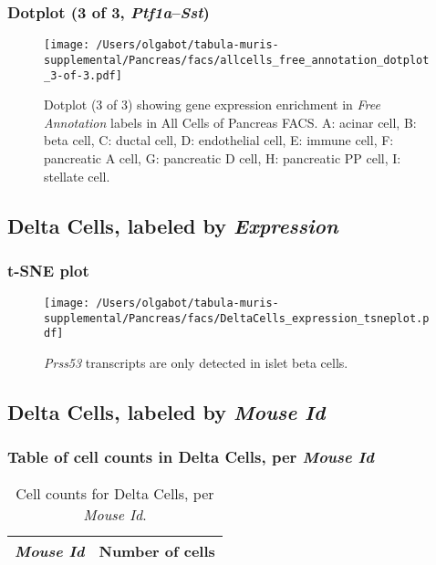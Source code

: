 \clearpage

\subsubsection{Dotplot (3 of 3, \emph{Ptf1a}--\emph{Sst})}
\begin{figure}[h]
\centering
\texttt{[image: /Users/olgabot/tabula-muris-supplemental/Pancreas/facs/allcells\_free\_annotation\_dotplot\_3-of-3.pdf]}

\caption{ Dotplot (3 of 3)  showing gene expression enrichment in \emph{Free Annotation} labels in All Cells of Pancreas FACS. A: acinar cell, B: beta cell, C: ductal cell, D: endothelial cell, E: immune cell, F: pancreatic A cell, G: pancreatic D cell, H: pancreatic PP cell, I: stellate cell.}
\end{figure}


\clearpage

\subsection{Delta Cells, labeled by \emph{Expression}}

\clearpage
\subsubsection{t-SNE plot}
\begin{figure}[h]
\centering
\texttt{[image: /Users/olgabot/tabula-muris-supplemental/Pancreas/facs/DeltaCells\_expression\_tsneplot.pdf]}

\caption{\emph{Prss53} transcripts are only detected in islet beta cells.
}
\end{figure}


\clearpage

\subsection{Delta Cells, labeled by \emph{Mouse Id}}
\subsubsection{Table of cell counts in Delta Cells, per \emph{Mouse Id}}\begin{table}[h]
\centering
\label{my-label}
\begin{tabular}{@{}ll@{}}
\toprule

\emph{Mouse Id}& Number of cells \\ \midrule\bottomrule
\end{tabular}
\caption{Cell counts for Delta Cells, per \emph{Mouse Id}.}
\end{table}

